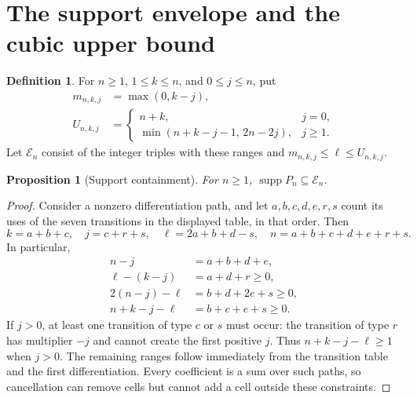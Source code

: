 \documentclass[11pt]{article}
\numberwithin{equation}{section}
\newtheorem{proposition}[theorem]{Proposition}
\theoremstyle{definition}
\newtheorem{definition}[theorem]{Definition}
\theoremstyle{remark}
\DeclareMathOperator{\supp}{supp}
\begin{document}
\section{The support envelope and the cubic upper bound}

\begin{definition}
For $n\ge1$, $1\le k\le n$, and $0\le j\le n$, put
\begin{align}
 m_{n,k,j}&=\max(0,k-j),\label{eq:lo}\\
 U_{n,k,j}&=
 \begin{cases}
 n+k,&j=0,\\
 \min(n+k-j-1,\,2n-2j),&j\ge1.
 \end{cases}\label{eq:hi}
\end{align}
Let $\mathcal E_n$ consist of the integer triples with these ranges and
$m_{n,k,j}\le\ell\le U_{n,k,j}$.
\end{definition}

\begin{proposition}[Support containment]\label{prop:envelope}
For $n\ge1$, $\supp P_n\subseteq\mathcal E_n$.
\end{proposition}
\begin{proof}
Consider a nonzero differentiation path, and let $a,b,c,d,e,r,s$ count its
uses of the seven transitions in the displayed table, in that order. Then
\[
 k=a+b+c,\quad j=c+r+s,\quad
 \ell=2a+b+d-s,\quad
 n=a+b+c+d+e+r+s.
\]
In particular,
\begin{align*}
 n-j&=a+b+d+e,\\
 \ell-(k-j)&=a+d+r\ge0,\\
 2(n-j)-\ell&=b+d+2e+s\ge0,\\
 n+k-j-\ell&=b+c+e+s\ge0.
\end{align*}
If $j>0$, at least one transition of type $c$ or $s$ must occur: the transition
of type $r$ has multiplier $-j$ and cannot create the first positive $j$.
Thus $n+k-j-\ell\ge1$ when $j>0$. The remaining ranges follow immediately
from the transition table and the first differentiation. Every coefficient
is a sum over such paths, so cancellation can remove cells but cannot add a
cell outside these constraints.
\end{proof}
\end{document}
